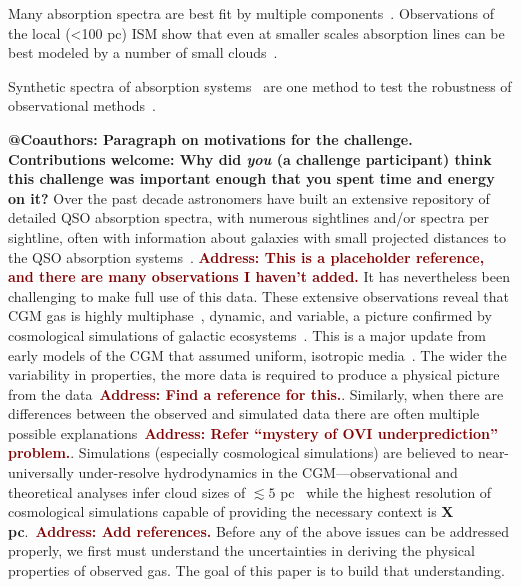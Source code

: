 \documentclass[fleqn,usenatbib]{mnras}
\makeatletter
\newcommand{\thoughts}[1]{\textcolor{BurntOrange}{\textbf{Contributions welcome: #1}}}
\newcommand{\todo}[1]{\textcolor{Maroon}{\textbf{Address: #1}}}
\newcommand{\note}[1]{\textbf{@Coauthors: #1}}
\makeatother
\begin{document}
Many absorption spectra are best fit by multiple components~\citep[e.g.][]{Muzahid2015, Liang2017, Liang2018, Haislmaier2020, Sameer2021, Zahedy2021, Marra2021, Marra2022}.
Observations of the local (<100 pc) ISM show that even at smaller scales absorption lines can be best modeled by a number of small clouds~\citep[e.g.][]{Welsh2010}.

Synthetic spectra of absorption systems~\citep[e.g.][]{Hummels2013, Liang2018} are one method to test the robustness of observational methods~\citep[e.g.][]{Churchill2015}.

\note{Paragraph on motivations for the challenge.}
\thoughts{
Why did \textit{you} (a challenge participant) think this challenge was important enough that you spent time and energy on it?
}
Over the past decade astronomers have built an extensive repository of detailed QSO absorption spectra, with numerous sightlines and/or spectra per sightline, often with information about galaxies with small projected distances to the QSO absorption systems~\citep[e.g.][]{Zahedy2019a, Zahedy2021}.
\todo{This is a placeholder reference, and there are many observations I haven't added.}
It has nevertheless been challenging to make full use of this data.
These extensive observations reveal that CGM gas is highly multiphase~\citep[][]{Zahedy2019a, Zahedy2021, Haislmaier2020}, dynamic, and variable, a picture confirmed by cosmological simulations of galactic ecosystems~\citep[e.g.][]{Hafen2019, Hafen2020}.
This is a major update from early models of the CGM that assumed uniform, isotropic media~\citep[e.g.][]{Maller2003, Srianand1994}.
The wider the variability in properties, the more data is required to produce a physical picture from the data~\todo{Find a reference for this.}.
Similarly, when there are differences between the observed and simulated data there are often multiple possible explanations~\todo{Refer ``mystery of OVI underprediction'' problem.}.
Simulations (especially cosmological simulations) are believed to near-universally under-resolve hydrodynamics in the CGM---observational and theoretical analyses infer cloud sizes of $\lesssim 5$ pc~\citep[e.g.][]{Zahedy2021} while the highest resolution of cosmological simulations capable of providing the necessary context is \textbf{X pc}.~\todo{Add references.}
Before any of the above issues can be addressed properly, we first must understand the uncertainties in deriving the physical properties of observed gas.
The goal of this paper is to build that understanding.
\end{document}

